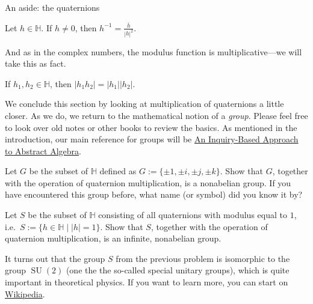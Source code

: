 \begin{section}{An aside: the quaternions}
\begin{theorem}
Let $h\in \mathbb{H}$. If $h\neq 0$, then $h^{-1} = \displaystyle\frac{\overline{h}}{|h|^2}$.
\end{theorem}

And as in the complex numbers, the modulus function is multiplicative---we will take this as fact.

\begin{fact}
If $h_1,h_2\in \mathbb{H}$, then $|h_1h_2| = |h_1||h_2|$.
\end{fact}

We conclude this section by looking at multiplication of quaternions a little closer. As we do, we return to the mathematical notion of a \emph{group}. Please feel free to look over old notes or other books to review the basics. As mentioned in the introduction, our main reference for groups will be  \href{https://github.com/dcernst/IBL-AbstractAlgebra/blob/master/Spring2018/IBL-AbstractAlgebra.pdf}{An Inquiry-Based Approach to Abstract Algebra}.

\begin{problem}
Let $G$ be the subset of $\mathbb{H}$ defined as $G:=\{\pm1,\pm i,\pm j,\pm k\}$. Show that $G$, together with the operation of quaternion multiplication, is a nonabelian group. If you have encountered this group before, what name (or symbol) did you know it by?
\end{problem}

\begin{problem}
Let $S$ be the subset of $\mathbb{H}$ consisting of all quaternions with modulus equal to $1$, i.e.~$S:=\{h\in \mathbb{H}\mid |h| = 1\}$. Show that $S$, together with the operation of quaternion multiplication, is an infinite, nonabelian group.
\end{problem}

It turns out that the group $S$ from the previous problem is isomorphic to the group $\operatorname{SU}(2)$ (one the the so-called special unitary groups), which is quite important in theoretical physics. If you want to learn more, you can start on \href{https://en.wikipedia.org/wiki/Special_unitary_group#The_group_SU(2)}{Wikipedia}.

\end{section}










